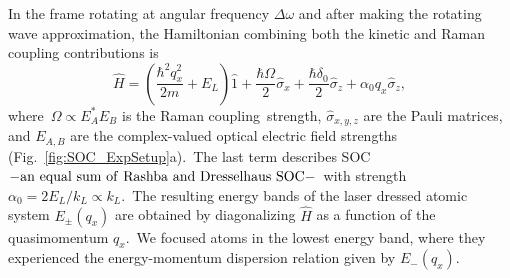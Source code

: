 \documentclass[twocolumn,amsmath,amssymb,floatfix,prl]{revtex4-1}
\begin{document}
In the frame rotating at angular frequency $\Delta\omega$ and after making the rotating wave approximation, the Hamiltonian combining both the kinetic and Raman coupling contributions is~\cite{LinSOC_2011} \begin{equation}\label{eqn:SOCHam_2x2}
\hat{H} = \left(\frac{\hbar^2 q_x^2 }{2m} + E_L\right) \hat{1} + \frac{\hbar \Omega}{2}\hat{\sigma}_x + \frac{\hbar \delta_0}{2}\hat{\sigma}_z + \alpha_0 q_x\hat{\sigma}_z,
\end{equation}
where~${\Omega \propto E^*_A E_B}$ is the Raman coupling~strength, $\hat{\sigma}_{x,y,z}$ are the Pauli matrices, and $E_{A,B}$ are the complex-valued optical electric field strengths (Fig.~\ref{fig:SOC_ExpSetup}a).~The last term describes SOC $-{\rm an~equal~sum~of~Rashba~and~Dresselhaus~SOC-}$~with strength $\alpha_0=2E_L / k_L\propto k_L$.~The resulting energy bands of the laser dressed atomic system $E_{\pm}(q_x)$ are obtained by diagonalizing ${\hat H}$ as a function of the quasimomentum $q_x$.~We focused atoms in the lowest energy band, where they experienced the energy-momentum dispersion relation given by $E_{-}(q_x)$.
\end{document}

